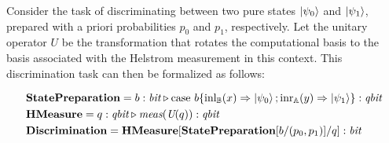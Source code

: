\documentclass[10pt,a4paper]{amsart}
\theoremstyle{definition}
\theoremstyle{definition}
\theoremstyle{definition}
\theoremstyle{definition}
\theoremstyle{definition}
\theoremstyle{definition}
\begin{document}
Consider the task of discriminating between two pure states $\ket{\psi_0}$ and $\ket{\psi_1}$, prepared with a priori probabilities $p_0$ and $p_1$, respectively. Let the unitary operator $U$  be the transformation that rotates the computational basis to the basis associated with the Helstrom measurement  in this context. This discrimination task can then be formalized as follows:

\begin{align*}
  &\textbf{StatePreparation} =  b:\textit{bit}  \triangleright  \text{case } b \{\text{inl}_{\mathbb{B}}(x) \Rightarrow \ket{\psi_0} ; \text{inr}_{\mathbb{A}}(y) \Rightarrow \ket{\psi_1}\}: \textit{qbit} \\
  &\textbf{HMeasure} =  q: \textit{qbit} \triangleright \textit{meas} (\textit{U}(q))  : \textit{qbit} \\
  &\textbf{Discrimination} =  \textbf{HMeasure} [ \textbf{StatePreparation} [b/(p_0,p_1)] / q] : \textit{bit}
\end{align*}



 

\end{document}
